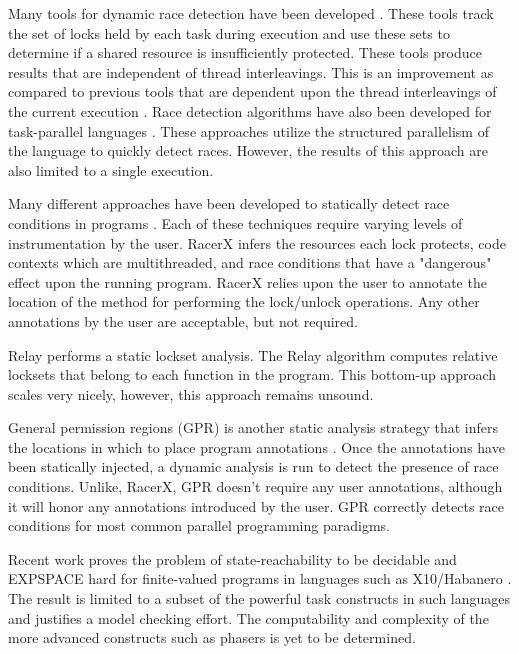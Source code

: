 Many tools for dynamic race detection have been developed \cite{Eraser,
Eraser-Upgrade, Cilk-Dynamic}. These tools track the set of locks held by each
task during execution and use these sets to determine if a shared resource is
insufficiently protected. These tools produce results that are independent of
thread interleavings. This is an improvement as compared to previous tools that are
dependent upon the thread interleavings of the current
execution \cite{Lamport-Comparison, Mesa, Lamport-Online}. 
Race detection algorithms have also been developed for task-parallel
languages \cite{Async-Finish-Race, SP-BAGS}. These approaches utilize the
structured parallelism of the language to quickly detect races. However, the
results of this approach are also limited to a single execution.

Many different approaches have been developed to statically detect race
conditions in programs \cite{ESC, Warlock, RacerX, Relay}. Each of these techniques
require varying levels of instrumentation by the user. RacerX infers
the resources each lock protects, code contexts which are multithreaded, and
race conditions that have a "dangerous" effect upon the running program.
RacerX relies upon the user to annotate the location of the method for
performing the lock/unlock operations. Any other annotations by the user
are acceptable, but not required.

Relay performs a static lockset analysis. The Relay algorithm computes relative
locksets that belong to each function in the program. This bottom-up approach
scales very nicely, however, this approach remains unsound.

General permission regions (GPR) is another static analysis strategy
that infers the locations in which to place program annotations \cite{Westbrook:2012:PPR:2367163.2367201}. Once the annotations have been
statically injected, a dynamic analysis is run to detect the presence of race
conditions. Unlike, RacerX, GPR doesn't require any user annotations, although
it will honor any annotations introduced by the user. GPR correctly detects race
conditions for most common parallel programming paradigms. 

\begin{comment} Such a dependence can be avoided, as in this work, by creating a
non-performance oriented runtime that is simple enough to manually verify for
correctness \cite{Morse:2012:MAM:2189257.2189279}. It is much easier to access
the state and direct behavior, as a model checker, in such systems.
\end{comment}

Recent work proves the problem of state-reachability to be decidable and
EXPSPACE hard for finite-valued programs in languages such as X10/Habanero
\cite{Bouajjani:2012:ARP:2103621.2103681}. The result is limited to a subset of
the powerful task constructs in such languages and justifies a model checking
effort. The computability and complexity of the more advanced constructs such as
phasers is yet to be determined.
